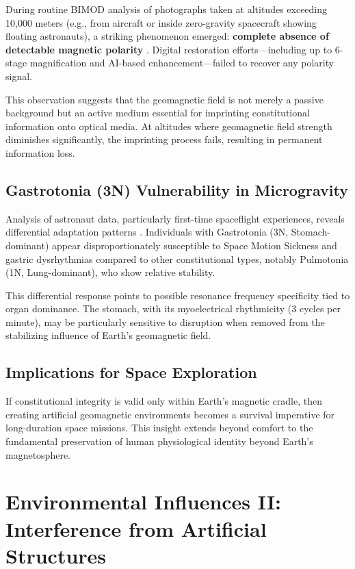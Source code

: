 \documentclass[12pt,a4paper]{article}
\begin{document}
During routine BIMOD analysis of photographs taken at altitudes exceeding 10,000 meters (e.g., from aircraft or inside zero-gravity spacecraft showing floating astronauts), a striking phenomenon emerged: \textbf{complete absence of detectable magnetic polarity} \cite{yoon2026_400}. Digital restoration efforts—including up to 6-stage magnification and AI-based enhancement—failed to recover any polarity signal.

This observation suggests that the geomagnetic field is not merely a passive background but an active medium essential for imprinting constitutional information onto optical media. At altitudes where geomagnetic field strength diminishes significantly, the imprinting process fails, resulting in permanent information loss.

\subsection{Gastrotonia (3N) Vulnerability in Microgravity}

Analysis of astronaut data, particularly first-time spaceflight experiences, reveals differential adaptation patterns \cite{NASA_SMS_2021}. Individuals with Gastrotonia (3N, Stomach-dominant) appear disproportionately susceptible to Space Motion Sickness and gastric dysrhythmias compared to other constitutional types, notably Pulmotonia (1N, Lung-dominant), who show relative stability.

This differential response points to possible resonance frequency specificity tied to organ dominance. The stomach, with its myoelectrical rhythmicity (3 cycles per minute), may be particularly sensitive to disruption when removed from the stabilizing influence of Earth's geomagnetic field.

\subsection{Implications for Space Exploration}

If constitutional integrity is valid only within Earth's magnetic cradle, then creating artificial geomagnetic environments becomes a survival imperative for long-duration space missions. This insight extends beyond comfort to the fundamental preservation of human physiological identity beyond Earth's magnetosphere.

\section{Environmental Influences II: Interference from Artificial Structures}
\end{document}

